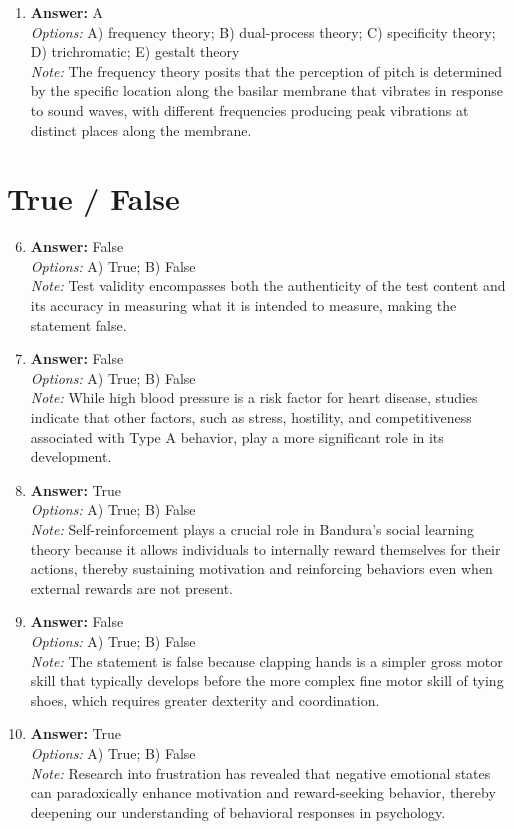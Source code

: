 \documentclass[12pt]{article}
\begin{document}
\begin{enumerate}[label=\arabic*.]
\item \textbf{Answer:} A
\\ \textit{Options:} A) frequency theory; B) dual-process theory; C) specificity theory; D) trichromatic; E) gestalt theory
\\ \textit{Note:} The frequency theory posits that the perception of pitch is determined by the specific location along the basilar membrane that vibrates in response to sound waves, with different frequencies producing peak vibrations at distinct places along the membrane.
\end{enumerate}

\section*{True / False}
\begin{enumerate}[label=\arabic*.]
\setcounter{enumi}{5}
\item \textbf{Answer:} False
\\ \textit{Options:} A) True; B) False
\\ \textit{Note:} Test validity encompasses both the authenticity of the test content and its accuracy in measuring what it is intended to measure, making the statement false.
\item \textbf{Answer:} False
\\ \textit{Options:} A) True; B) False
\\ \textit{Note:} While high blood pressure is a risk factor for heart disease, studies indicate that other factors, such as stress, hostility, and competitiveness associated with Type A behavior, play a more significant role in its development.
\item \textbf{Answer:} True
\\ \textit{Options:} A) True; B) False
\\ \textit{Note:} Self-reinforcement plays a crucial role in Bandura's social learning theory because it allows individuals to internally reward themselves for their actions, thereby sustaining motivation and reinforcing behaviors even when external rewards are not present.
\item \textbf{Answer:} False
\\ \textit{Options:} A) True; B) False
\\ \textit{Note:} The statement is false because clapping hands is a simpler gross motor skill that typically develops before the more complex fine motor skill of tying shoes, which requires greater dexterity and coordination.
\item \textbf{Answer:} True
\\ \textit{Options:} A) True; B) False
\\ \textit{Note:} Research into frustration has revealed that negative emotional states can paradoxically enhance motivation and reward-seeking behavior, thereby deepening our understanding of behavioral responses in psychology.
\end{enumerate}
\end{document}
